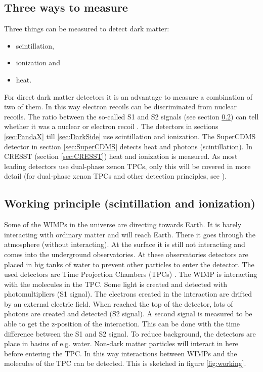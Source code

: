 \documentclass{article}
\begin{document}
\subsection{Three ways to measure}
Three things can be measured to detect dark matter:
\begin{itemize}
    \item scintillation,
    \item ionization and
    \item heat.
\end{itemize}
For direct dark matter detectors it is an advantage to measure a combination of two of them. In this way electron recoils can be discriminated from nuclear recoils. The ratio between the so-called S1 and S2 signals (see section \ref{sec:working_principle}) can tell whether it was a nuclear or electron recoil \cite{Aprile:2009dv}. The detectors in sections \ref{sec:PandaX} till \ref{sec:DarkSide} use scintillation and ionization. The SuperCDMS detector in section \ref{sec:SuperCDMS} detects heat and photons (scintillation). In CRESST (section \ref{sec:CRESST}) heat and ionization is measured. As most leading detectors use dual-phase xenon TPCs, only this will be covered in more detail (for dual-phase xenon TPCs and other detection principles, see \cite{Aprile:2009dv}).


\subsection{Working principle (scintillation and ionization)}
\label{sec:working_principle}
Some of the WIMPs in the universe are directing towards Earth. It is barely interacting with ordinary matter and will reach Earth. There it goes through the atmosphere (without interacting). At the surface it is still not interacting and comes into the underground observatories. At these observatories detectors are placed in big tanks of water to prevent other particles to enter the detector. The used detectors are Time Projection Chambers (TPCs) \cite{Akerib:2015gmi}. The WIMP is interacting with the molecules in the TPC. Some light is created and detected with photomultipliers (S1 signal). The electrons created in the interaction are drifted by an external electric field. When reached the top of the detector, lots of photons are created and detected (S2 signal). A second signal is measured to be able to get the z-position of the interaction. This can be done with the time difference between the S1 and S2 signal. To reduce background, the detectors are place in basins of e.g. water. Non-dark matter particles will interact in here before entering the TPC. In this way interactions between WIMPs and the molecules of the TPC can be detected. This is sketched in figure \ref{fig:working}.
\end{document}

